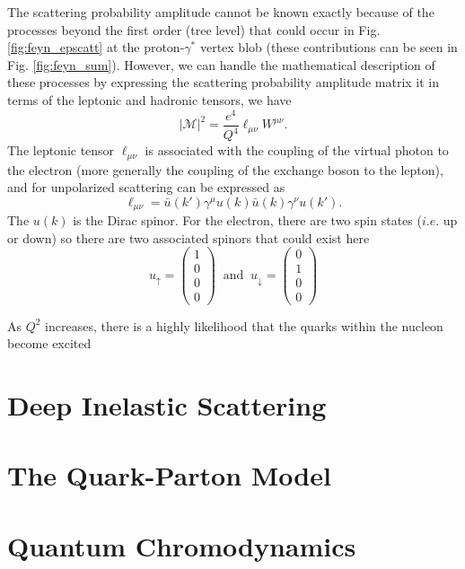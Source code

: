 The scattering probability amplitude cannot be known exactly because of the processes beyond the first order (tree level) that could occur in Fig. \ref{fig:feyn_epscatt} at the proton-$\gamma^{*}$ vertex blob (these contributions can be seen in Fig. \ref{fig:feyn_sum}). However, we can handle the mathematical description of these processes by expressing the scattering probability amplitude matrix it in terms of the leptonic and hadronic tensors, we have
\begin{equation}
|\mathcal{M}|^2 = \frac{e^4}{Q^4} \ell_{\mu\nu} W^{\mu \nu}.
\end{equation}
The leptonic tensor $\ell_{\mu\nu}$ is associated with the coupling of the virtual photon to the electron (more generally the coupling of the exchange boson to the lepton), and for unpolarized scattering can be expressed as
\begin{equation}
\label{eqn:lep_tens}
\ell_{\mu\nu} = \bar{u}(k')\gamma^{\mu}u(k) \bar{u}(k) \gamma^{\nu} u(k').
\end{equation}
The $u(k)$ is the Dirac spinor. For the electron, there are two spin states ($i.e.$ up or down) so there are two associated spinors that could exist here
\begin{equation}
u_{\uparrow} = \left( \begin{array}{c} 1 \\ 0 \\ 0 \\ 0 \end{array} \right) \; \; \mathrm{and} \; \;
u_{\downarrow} = \left( \begin{array}{c} 0 \\ 1 \\ 0 \\ 0 \end{array} \right)
\end{equation}

As $Q^2$ increases, there is a highly likelihood that the quarks within the nucleon become excited 

\section{Deep Inelastic Scattering}

\section{The Quark-Parton Model}
\section{Quantum Chromodynamics}
